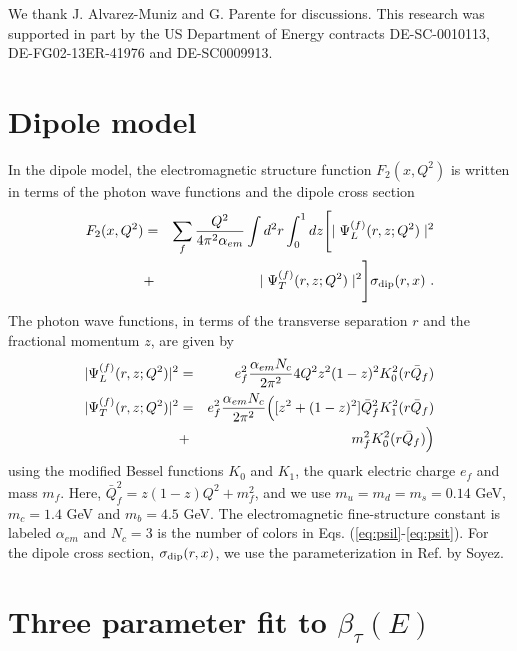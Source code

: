 \documentclass[aps,10pt,twocolumn,tightenlines]{revtex4-1}
\begin{document}
\begin{acknowledgments}
We thank J. Alvarez-Muniz and G. Parente for discussions.
This research was supported in part by the US Department of Energy contracts DE-SC-0010113,  DE-FG02-13ER-41976 and DE-SC0009913.
\end{acknowledgments}


\begin{appendix}

\section{Dipole model}

In the dipole model, the electromagnetic structure function $F_2(x,Q^2)$ is written in terms of the photon wave functions 
and the dipole cross section \cite{Nikolaev:1990ja} 
\begin{eqnarray}
\nonumber
F_2(x,Q^2) &=& \sum_f  \frac{Q^2}{4\pi^2 \alpha_{em}}  \int d^2r \int_0^1 dz \Biggl[ \mid \Psi_{L}^{(f)}(r,z;Q^2) \mid^2\\
&+&  \mid \Psi_{T}^{(f)}(r,z;Q^2) \mid^2 \Biggr] \sigma_{\rm dip}(r,x) \ . 
\end{eqnarray}
%
The photon wave functions, in terms of the transverse separation $r$ and the fractional momentum $z$, are given by  
\begin{eqnarray}
\label{eq:psil}
|\Psi_L^{(f)}(r,z ;Q^2) |^2&=&e_f^2\frac{\alpha_{em} N_c}{2\pi^2} 4Q^2 z^2(1-z)^2K_0^2(r \bar{Q}_f)\\
\nonumber
|\Psi_T^{(f)}(r,z;Q^2) |^2&=&e_f^2\frac{\alpha_{em} N_c}{2\pi^2}\Bigl( [z^2+(1-z)^2]
\bar{Q}_f^2 K_1^2(r \bar{Q}_f)\\
&+& m_f^2 K_0^2(r \bar{Q}_f)\Bigr) 
\label{eq:psit}
\end{eqnarray}
using the modified Bessel functions $K_0$ and $K_1$, the quark electric charge $e_f$ and mass $m_f$.
Here,  $\bar{Q}_f^2=z (1-z) Q^2+m_f^2$, and we use $m_u=m_d=m_s=0.14$ GeV, $m_c=1.4$ GeV and $m_b=4.5$ GeV. 
The electromagnetic fine-structure constant is labeled $\alpha_{em}$ and
$N_c=3$ is the number of colors in Eqs. (\ref{eq:psil}-\ref{eq:psit}).
For the dipole cross section, $\sigma_{\rm dip}(r,x)$, we use the parameterization in Ref. \cite{Soyez:2007kg} by Soyez.



\section{Three parameter fit to $\beta_\tau(E)$}



\end{appendix}
\end{document}
